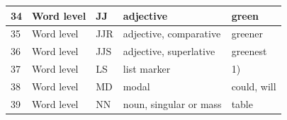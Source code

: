 \begin{longtable}{|p{}|p{}|p{}|p{}|p{}|}
		\rowcolor[HTML]{9AFF99} 
		34                                                        & Word level                                                  & JJ                                                         & adjective                                                                                                       & green                                                                           \\ \hline
		\rowcolor[HTML]{9AFF99} 
		35                                                        & Word level                                                  & JJR                                                        & adjective, comparative                                                                                          & greener                                                                         \\ \hline
		\rowcolor[HTML]{9AFF99} 
		36                                                        & Word level                                                  & JJS                                                        & adjective, superlative                                                                                          & greenest                                                                        \\ \hline
		\rowcolor[HTML]{9AFF99} 
		37                                                        & Word level                                                  & LS                                                         & list marker                                                                                                     & 1)                                                                              \\ \hline
		\rowcolor[HTML]{9AFF99} 
		38                                                        & Word level                                                  & MD                                                         & modal                                                                                                           & could, will                                                                     \\ \hline
		\rowcolor[HTML]{FFCCC9} 
		39                                                        & Word level                                                  & NN                                                         & noun, singular or mass                                                                                          & table                                                                           \\ \hline

\end{longtable}
